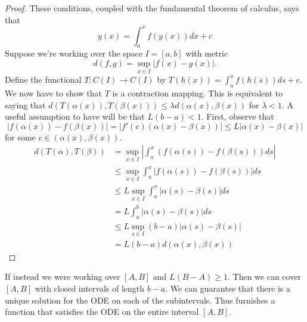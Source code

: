\documentclass{article}
\newcommand{\ra}[1][]{\xrightarrow{#1}}
\begin{document}
\begin{proof}
  These conditions, coupled with the fundamental theorem of calculus, says that
  $$y(x)=\int_a^xf(y(x))dx+c$$
  Suppose we're working over the space $I=[a,b]$ with metric
  $$d(f,g)=\sup_{x\in I}|f(x)-g(x)|.$$
  Define the functional $T:C(I)\ra C(I)$ by $T(h(x))=\int_a^xf(h(s))ds+c$. We now have to show that $T$ is a contraction mapping. This is equivalent to saying that $d(T(\alpha(x)),T(\beta(x)))\leq \lambda d(\alpha(x),\beta(x))$ for $\lambda<1$. A useful assumption to have will be that $L(b-a)<1$. First, observe that
  $$|f(\alpha(x))-f(\beta(x))|=|f'(c)(\alpha(x)-\beta(x))|\leq L|\alpha(x)-\beta(x)|$$
  for some $c\in (\alpha(x),\beta(x))$.
  \begin{equation*}
    \begin{split}
      d(T(\alpha),T(\beta)) & =\sup_{x\in I}|\int_a^x(f(\alpha(s))-f(\beta(s)))ds| \\
      & \leq \sup_{x\in I}\int_a^x|f(\alpha(s))-f(\beta(s))|ds \\ %
      & \leq L\sup_{x\in I}\int_a^x|\alpha(s)-\beta(s)|ds \\ %
      & = L\int_a^b|\alpha(s)-\beta(s)|ds \\
      & \leq L\sup_{s\in I}(b-a)|\alpha(s)-\beta(s)| \\
      & = L(b-a)d(\alpha(x),\beta(x))
    \end{split}
  \end{equation*}
\end{proof}
If instead we were working over $[A,B]$ and $L(B-A)\geq 1$. Then we can cover $[A,B]$ with closed intervals of length $b-a$. We can guarantee that there is a unique solution for the ODE on each of the subintervals. Thus furnishes a function that satisfies the ODE on the entire interval $[A,B]$.
\end{document}
